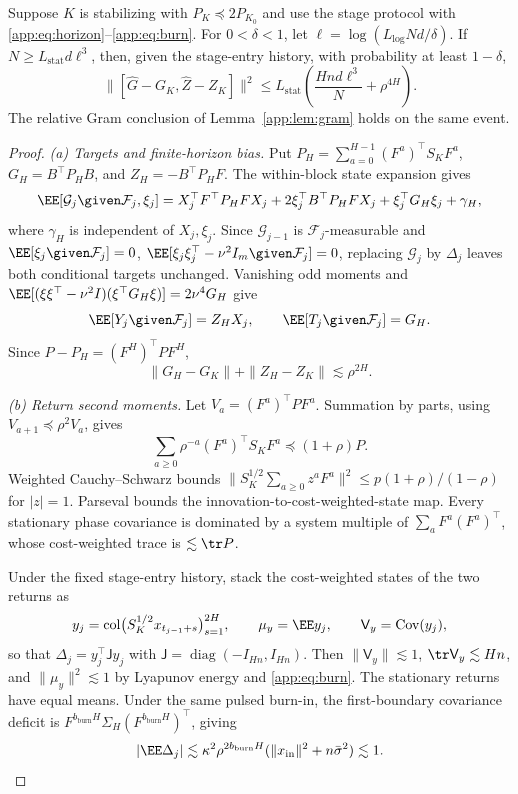\begin{lemma}\label{app:lem:stein}
Suppose $K$ is stabilizing with $P_K\preceq2P_{K_0}$ and use the
stage protocol with \eqref{app:eq:horizon}--\eqref{app:eq:burn}.
For $0<\delta<1$, let $\ell=\log(L_{\log}Nd/\delta)$.
If $N\ge L_{\mathrm{stat}}d\ell^3$, then, given the stage-entry history,
with probability at least $1-\delta$,
\[
 \|[\widehat G-G_K,\widehat Z-Z_K]\|^2
 \le L_{\mathrm{stat}}\left(\frac{Hnd\ell^3}{N}+\rho^{4H}\right).
\]
The relative Gram conclusion of Lemma~\ref{app:lem:gram} holds
on the same event.
\end{lemma}
\begin{proof}
\emph{(a) Targets and finite-horizon bias.}
Put $P_H=\sum_{a=0}^{H-1}(F^a)^\top S_KF^a$,
$G_H=B^\top P_HB$, and $Z_H=-B^\top P_HF$.
The within-block state expansion gives
\[
 \EE[\mathcal G_j\given\mathcal F_j,\xi_j]
 =X_j^\top F^\top P_HFX_j+2\xi_j^\top B^\top P_HFX_j
             +\xi_j^\top G_H\xi_j+\gamma_H ,
\]
where $\gamma_H$ is independent of $X_j,\xi_j$.
Since $\mathcal G_{j-1}$ is $\mathcal F_j$-measurable and
$\EE[\xi_j\given\mathcal F_j]=0$,
$\EE[\xi_j\xi_j^\top-\nu^2I_m\given\mathcal F_j]=0$, replacing
$\mathcal G_j$ by $\Delta_j$ leaves both conditional targets unchanged. Vanishing odd
moments and
$\EE[(\xi\xi^\top-\nu^2I)(\xi^\top G_H\xi)]=2\nu^4G_H$ give
\begin{equation}\label{app:eq:targets}
 \EE[Y_j\given\mathcal F_j]=Z_HX_j,\qquad
 \EE[T_j\given\mathcal F_j]=G_H.
\end{equation}
Since $P-P_H=(F^H)^\top PF^H$,
\begin{equation}\label{app:eq:bias}
 \|G_H-G_K\|+\|Z_H-Z_K\|\lesssim\rho^{2H}.
\end{equation}

\emph{(b) Return second moments.}
Let $V_a=(F^a)^\top PF^a$. Summation by parts, using
$V_{a+1}\preceq\rho^2V_a$, gives
\[
 \sum_{a\ge0}\rho^{-a}(F^a)^\top S_KF^a\preceq(1+\rho)P .
\]
Weighted Cauchy--Schwarz bounds
$\|S_K^{1/2}\sum_{a\ge0}z^aF^a\|^2\le p(1+\rho)/(1-\rho)$
for $|z|=1$. Parseval bounds the innovation-to-cost-weighted-state
map. Every stationary phase covariance is dominated by a system multiple
of $\sum_aF^a(F^a)^\top$, whose cost-weighted trace is
$\lesssim\tr P$.

Under the fixed stage-entry history, stack the cost-weighted states of
the two returns as
\[
 y_j=\operatorname{col}\bigl(S_K^{1/2}x_{t_{j-1}+s}\bigr)_{s=1}^{2H},
 \qquad \mu_y=\EE y_j,\qquad \mathsf V_y=\operatorname{Cov}(y_j),
\]
so that $\Delta_j=y_j^\top\mathsf Jy_j$ with
$\mathsf J=\operatorname{diag}(-I_{Hn},I_{Hn})$. Then
$\|\mathsf V_y\|\lesssim1$, $\tr\mathsf V_y\lesssim Hn$, and
$\|\mu_y\|^2\lesssim1$ by Lyapunov energy and
\eqref{app:eq:burn}. The stationary returns have equal means.
Under the same pulsed burn-in, the first-boundary covariance deficit
is $F^{b_{\mathrm{burn}}H}\Sigma_H(F^{b_{\mathrm{burn}}H})^\top$,
giving
\[
 |\EE\Delta_j|\lesssim\kappa^2\rho^{2b_{\mathrm{burn}}H}
 (\|x_{\mathrm{in}}\|^2+n\bar\sigma^2)\lesssim1 .
\]


\end{proof}
